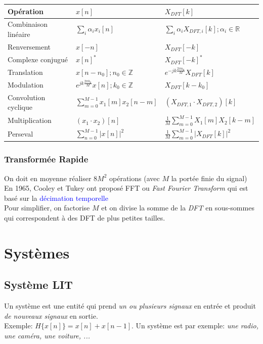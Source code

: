 \documentclass{report}
\begin{document}
\begin{center}
\begin{tabular}{| m{2cm} | m{4cm} | m{4cm} |}
\hline
Opération &$x[n]$& $X_{DFT}[k]$\\
\hline
Combinaison linéaire & $\sum_i \alpha_i x_i[n]$ & $\sum_i \alpha_i X_{DFT,i} [k]; \alpha_i \in \mathbb{R}$ \\
\hline
Renversement & $x[-n]$ & $X_{DFT}[-k]$ \\
\hline
Complexe conjugué & $x[n]^{\ast}$ & $X_{DFT}[-k]^{\ast}$\\
\hline
Translation & $x[n-n_0]; n_0 \in \mathbb{Z}$ & $e^{-jk\frac{2\pi n_0}{M}}X_{DFT}[k]$ \\
\hline
Modulation & $e^{jk\frac{2\pi k_0}{M}}x[n]; k_0 \in \mathbb{Z}$ & $X_{DFT}[k-k_0]$ \\
\hline
Convolution cyclique & $\sum_{m=0}^{M-1}x_1[m]x_2[n-m]$ & $(X_{DFT,1}\cdot X_{DFT,2})[k]$ \\
\hline
Multiplication & $(x_1 \cdot x_2)[n]$ & $\frac{1}{M} \sum_{m=0}^{M-1} X_1[m]X_2[k-m]$ \\
\hline
Perseval & $\sum_{n=0}^{M-1} |x[n]|^2$ & $\frac{1}{M}\sum_{m=0}^{M-1}|X_{DFT}[k]|^2$ \\
\hline
\end{tabular}
\end{center}

\section{Transformée Rapide}
On doit en moyenne réaliser $8M^2$ opérations (avec $M$ la portée finie du signal)\\
En 1965, Cooley et Tukey ont proposé FFT ou \textit{Fast Fourier Transform} qui est basé sur la \textcolor{blue}{décimation temporelle}\\
Pour simplifier, on factorise $M$ et on divise la somme de la \textit{DFT} en sous-sommes qui correspondent à des DFT de plus petites tailles.


\part{Systèmes}

\chapter{Système LIT}
Un système est une entité qui prend \textit{un ou plusieurs signaux} en entrée et produit \textit{de nouveaux signaux} en sortie.\\
Exemple: $H\{x[n]\} = x[n] + x[n-1]$. Un système est par exemple: \textit{une radio, une caméra, une voiture, ...}
\end{document}
